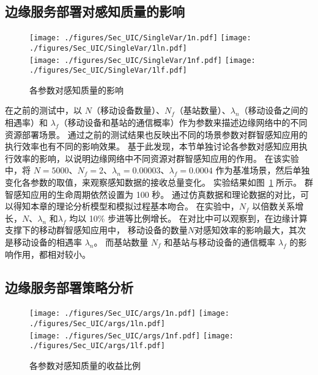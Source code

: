 \subsection{边缘服务部署对感知质量的影响}

\begin{figure}[!b]
  \centering
	{\texttt{[image: ./figures/Sec\_UIC/SingleVar/1n.pdf]}}
	{\texttt{[image: ./figures/Sec\_UIC/SingleVar/1ln.pdf]}}\\
	{\texttt{[image: ./figures/Sec\_UIC/SingleVar/1nf.pdf]}}
	{\texttt{[image: ./figures/Sec\_UIC/SingleVar/1lf.pdf]}}
	\vspace{-1em}
	\caption{各参数对感知质量的影响}
	\label{Figure_SingleValTest}
\end{figure}

在之前的测试中，以 $N$（移动设备数量）、$N_f$（基站数量）、$\lambda_n$（移动设备之间的相遇率）和 $\lambda_f$（移动设备和基站的通信概率）作为参数来描述边缘网络中的不同资源部署场景。
通过之前的测试结果也反映出不同的场景参数对群智感知应用的执行效率也有不同的影响效果。
基于此发现，本节单独讨论各参数对感知应用执行效率的影响，以说明边缘网络中不同资源对群智感知应用的作用。
在该实验中，将 $N=5000$、$N_f=2$、$\lambda_n = 0.00003$、$\lambda_f=0.0004$ 作为基准场景，然后单独变化各参数的取值，来观察感知数据的接收总量变化。
实验结果如图~\ref{Figure_SingleValTest} 所示。
群智感知应用的生命周期依然设置为 100 秒。
通过仿真数据和理论数据的对比，可以得知本章的理论分析模型和模拟过程基本吻合。
在实验中，$N_f$ 以倍数关系增长，$N$、$\lambda_n$ 和$\lambda_f$ 均以 10\% 步进等比例增长。
在对比中可以观察到，在边缘计算支撑下的移动群智感知应用中，
移动设备的数量$N$对感知效率的影响最大，其次是移动设备的相遇率 $\lambda_n$。
而基站数量 $N_f$ 和基站与移动设备的通信概率 $\lambda_f$ 的影响作用，都相对较小。

\subsection{边缘服务部署策略分析}

\begin{figure}[!b]
  \centering
	{\texttt{[image: ./figures/Sec\_UIC/args/1n.pdf]}}
	{\texttt{[image: ./figures/Sec\_UIC/args/1ln.pdf]}}\\
	{\texttt{[image: ./figures/Sec\_UIC/args/1nf.pdf]}}
	{\texttt{[image: ./figures/Sec\_UIC/args/1lf.pdf]}}
	\vspace{-1em}
	\caption{各参数对感知质量的收益比例}
	\label{Figure_SingleVal}
\end{figure}

